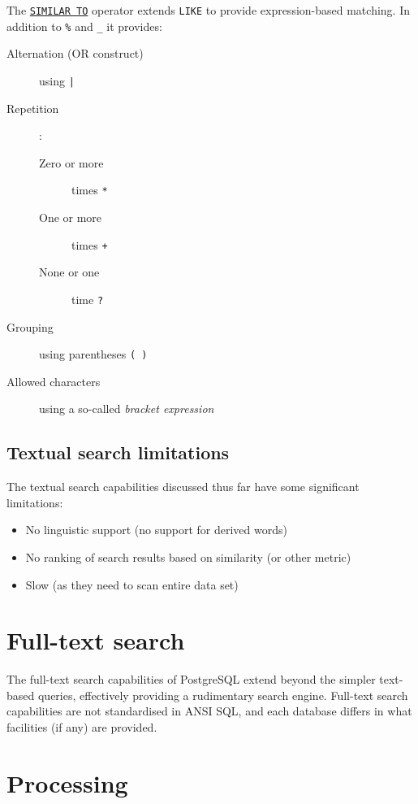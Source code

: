 \documentclass[slides]{pgnotes}
\begin{document}
The \href{https://www.postgresql.org/docs/current/functions-matching.html#FUNCTIONS-SIMILARTO-REGEXP}{\texttt{SIMILAR TO}} operator extends \texttt{LIKE} to provide expression-based matching.
In addition to \texttt{\%} and \texttt{\_} it provides:

\begin{description}
\item[Alternation (OR construct)] using \texttt{|}
\item[Repetition]:
  \begin{description}
  \item[Zero or more] times \texttt{*}
  \item[One or more] times \texttt{+}
  \item[None or one] time \texttt{?}
  \end{description}
\item[Grouping] using parentheses \texttt{( )}
\item[Allowed characters] using a so-called \textit{bracket expression} 
\end{description}

\subsection{Textual search limitations}

The textual search capabilities discussed thus far have some significant limitations:

\begin{itemize}
\item No linguistic support (no support for derived words)
\item No ranking of search results based on similarity (or other metric)
\item Slow (as they need to scan entire data set)
\end{itemize}

\section{Full-text search} 

The full-text search capabilities of PostgreSQL extend beyond the simpler text-based queries, effectively providing a rudimentary search engine.
Full-text search capabilities are not standardised in ANSI SQL, and each database differs in what facilities (if any) are provided.

\section{Processing}
\end{document}
